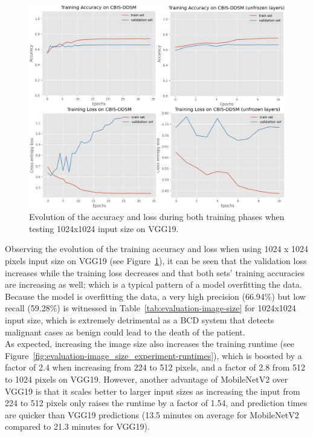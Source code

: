 \begin{figure}[h]
\centerline{\includegraphics[width=1.2\textwidth]{figures/evaluation/image_size_experiment/training_summary.png}}
\caption{\label{fig:evaluation-image_size_experiment-training_summary}Evolution of the accuracy and loss during both training phases when testing 1024x1024 input size on VGG19.}
\end{figure}

Observing the evolution of the training accuracy and loss when using 1024 x 1024 pixels input size on VGG19 (see Figure~\ref{fig:evaluation-image_size_experiment-training_summary}), it can be seen that the validation loss increases while the training loss decreases and that both sets' training accuracies are increasing as well; which is a typical pattern of a model overfitting the data. Because the model is overfitting the data, a very high precision (66.94\%) but low recall (59.28\%) is witnessed in Table~\ref{tab:evaluation-image-size} for 1024x1024 input size, which is extremely detrimental as a BCD system that detects malignant cases as benign could lead to the death of the patient.\\

As expected, increasing the image size also increases the training runtime (see Figure~\ref{fig:evaluation-image_size_experiment-runtimes}), which is boosted by a factor of 2.4 when increasing from 224 to 512 pixels, and a factor of 2.8 from 512 to 1024 pixels on VGG19. However, another advantage of MobileNetV2 over VGG19 is that it scales better to larger input sizes as increasing the input from 224 to 512 pixels only raises the runtime by a factor of 1.54, and prediction times are quicker than VGG19 predictions (13.5 minutes on average for MobileNetV2 compared to 21.3 minutes for VGG19).

